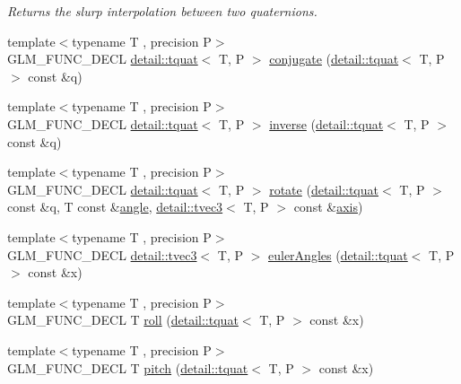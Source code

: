 \begin{DoxyCompactItemize}
\begin{DoxyCompactList}\small\item\em Returns the slurp interpolation between two quaternions. \end{DoxyCompactList}\item 
{\footnotesize template$<$typename T , precision P$>$ }\\G\+L\+M\+\_\+\+F\+U\+N\+C\+\_\+\+D\+E\+CL \hyperlink{structglm_1_1detail_1_1tquat}{detail\+::tquat}$<$ T, P $>$ \hyperlink{group__gtc__quaternion_gaf78006c47276b151777fc194cf11a688}{conjugate} (\hyperlink{structglm_1_1detail_1_1tquat}{detail\+::tquat}$<$ T, P $>$ const \&q)
\item 
{\footnotesize template$<$typename T , precision P$>$ }\\G\+L\+M\+\_\+\+F\+U\+N\+C\+\_\+\+D\+E\+CL \hyperlink{structglm_1_1detail_1_1tquat}{detail\+::tquat}$<$ T, P $>$ \hyperlink{group__gtc__quaternion_ga6613ef61cb980a18f19ece5f421564da}{inverse} (\hyperlink{structglm_1_1detail_1_1tquat}{detail\+::tquat}$<$ T, P $>$ const \&q)
\item 
{\footnotesize template$<$typename T , precision P$>$ }\\G\+L\+M\+\_\+\+F\+U\+N\+C\+\_\+\+D\+E\+CL \hyperlink{structglm_1_1detail_1_1tquat}{detail\+::tquat}$<$ T, P $>$ \hyperlink{group__gtc__quaternion_gaa9a8891f03d8f5373525c4b3159c1c73}{rotate} (\hyperlink{structglm_1_1detail_1_1tquat}{detail\+::tquat}$<$ T, P $>$ const \&q, T const \&\hyperlink{group__gtc__quaternion_ga23a3fc7ada5bbb665ff84c92c6e0542c}{angle}, \hyperlink{structglm_1_1detail_1_1tvec3}{detail\+::tvec3}$<$ T, P $>$ const \&\hyperlink{group__gtc__quaternion_ga8eef9f8c3f2e4836dccf09df975b20fb}{axis})
\item 
{\footnotesize template$<$typename T , precision P$>$ }\\G\+L\+M\+\_\+\+F\+U\+N\+C\+\_\+\+D\+E\+CL \hyperlink{structglm_1_1detail_1_1tvec3}{detail\+::tvec3}$<$ T, P $>$ \hyperlink{group__gtc__quaternion_gade4034f49ccadf63cb31a7fb5fa3c8aa}{euler\+Angles} (\hyperlink{structglm_1_1detail_1_1tquat}{detail\+::tquat}$<$ T, P $>$ const \&x)
\item 
{\footnotesize template$<$typename T , precision P$>$ }\\G\+L\+M\+\_\+\+F\+U\+N\+C\+\_\+\+D\+E\+CL T \hyperlink{group__gtc__quaternion_ga6d883e423bc425f4334fcce202131f7e}{roll} (\hyperlink{structglm_1_1detail_1_1tquat}{detail\+::tquat}$<$ T, P $>$ const \&x)
\item 
{\footnotesize template$<$typename T , precision P$>$ }\\G\+L\+M\+\_\+\+F\+U\+N\+C\+\_\+\+D\+E\+CL T \hyperlink{group__gtc__quaternion_ga4d345dc369a54f53f5ebc375bac56d11}{pitch} (\hyperlink{structglm_1_1detail_1_1tquat}{detail\+::tquat}$<$ T, P $>$ const \&x)

\end{DoxyCompactItemize}

